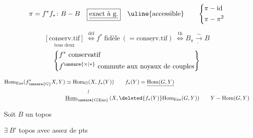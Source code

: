 \[
\pi=f^*f_*\colon B-B\quad \boxed{\underline{\text{exact à g.}}}\quad\uline{\text{accessible}}
\qquad
\left\{\begin{aligned}\pi&-\mathrm{id}\\ \pi&-\pi^2\end{aligned}\right.
\]

\[
\underset{\text{tous deux}}{[\text{conserv.tif}]}\ 
\overset{\mathrm{déf}}{\Longleftrightarrow} f^*\ \text{fidèle}\ (= \underline{\text{conserv.tif}})\
\overset{\mathrm{th}}{\Longleftrightarrow}\underline{B_\pi\xrightarrow{\sim}B}
\]
\[
\left\{\begin{aligned}
& f^*\ \text{conservatif}\\
& f^{\unsure{\times|*}}\ \text{commute aux noyaux de couples}
\end{aligned}\right\}
\]

\[
\begin{aligned}
\mathrm{Hom}_{\mathrm{Ens}}(f^*_{\unsure{G}}X,Y)&\simeq\mathrm{Hom}_G(X,f_*(Y))\qquad
f_*(Y)=\underline{\mathrm{Hom}(G,Y)}\\
&\hspace{4em}\wr\\[-.7ex]
&\underline{\mathrm{Hom}}_{\unsure{G|\mathrm{Ens}}}\,(X,\deleted{f_*(Y)}\mathrm{Hom}_{\mathrm{Ens}}(G,Y))
\qquad Y-\mathrm{Hom}(G,Y)
\end{aligned}
\]

Soit $B$ un topos

$\exists\ B'$ topos avec assez de pts
\diagram{\begin{tikzcd}[ampersand replacement=\&]
\widetilde C\arrow[r,"\simeq" description,draw=none]\arrow[d,"\unsure{\rho|\hookrightarrow}" description,draw=none]\& B\arrow[d,"f"] \&
B\arrow[d,shift right=.6ex,"f_*"']\\
\widehat C\& B'\&B'\arrow[u,shift right=.6ex,"f^*"']
\end{tikzcd}}

